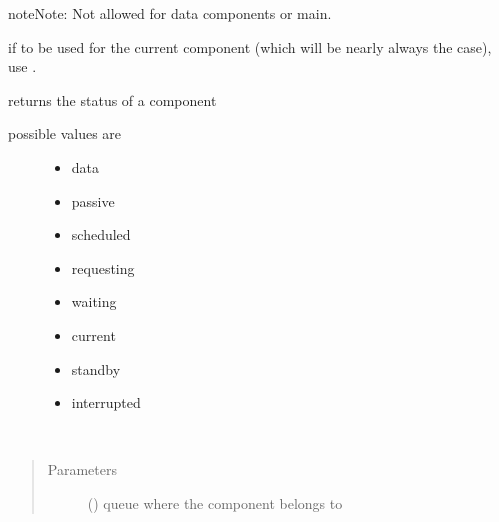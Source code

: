\documentclass[letterpaper,10pt,english]{sphinxmanual}
\begin{document}
\begin{fulllineitems}
\begin{fulllineitems}
\begin{quote}
\begin{description}
\end{description}\end{quote}

\begin{sphinxadmonition}{note}{Note:}
Not allowed for data components or main.

if to be used for the current component
(which will be nearly always the case),
use .
\end{sphinxadmonition}

\end{fulllineitems}


\begin{fulllineitems}
\label{\detokenize{Reference:salabim.Component.status}}
returns the status of a component
\begin{description}
\item[{possible values are}] \leavevmode\begin{itemize}
\item {} 
data

\item {} 
passive

\item {} 
scheduled

\item {} 
requesting

\item {} 
waiting

\item {} 
current

\item {} 
standby

\item {} 
interrupted

\end{itemize}

\end{description}

\end{fulllineitems}


\begin{fulllineitems}
\label{\detokenize{Reference:salabim.Component.successor}}~\begin{quote}\begin{description}
\item[{Parameters}] \leavevmode
{} ({\hyperref[\detokenize{Reference:salabim.Queue}]{}}) \textendash{} queue where the component belongs to


\end{description}
\end{quote}
\end{fulllineitems}
\end{fulllineitems}
\end{document}
